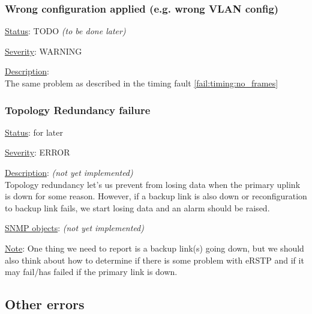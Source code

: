 \subsubsection{\bf Wrong configuration applied (e.g. wrong VLAN config)}
		\begin{packed_enum}
			\item [] \underline{Status}: TODO \emph{(to be done later)}
			\item [] \underline{Severity}: WARNING
			\item [] \underline{Description}:\\
				The same problem as described in the timing fault
				\ref{fail:timing:no_frames}
		\end{packed_enum}

\subsubsection{\bf Topology Redundancy failure}
		\begin{packed_enum}
			\item [] \underline{Status}: for later
			\item [] \underline{Severity}: ERROR
			\item [] \underline{Description}: \emph{(not yet implemented)}\\
				Topology redundancy let's us prevent from losing data when the primary
				uplink is down for some reason. However, if a backup link is also down
				or reconfiguration to backup link fails, we start losing data and an
				alarm should be raised.
			\item [] \underline{SNMP objects}: \emph{(not yet implemented)}
			\item [] \underline{Note}: One thing we need to report is a backup link(s)
				going down, but we should also think about how to determine if there is
				some problem with eRSTP and if it may fail/has failed if the primary
				link is down.
		\end{packed_enum}

\newpage
\subsection{Other errors}
\label{sec:other_fail}

